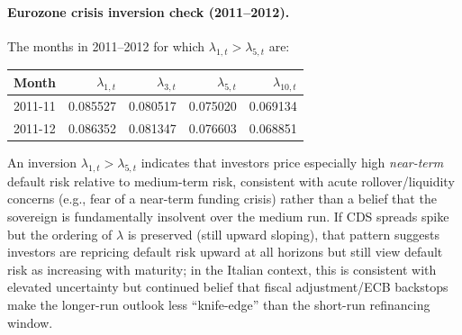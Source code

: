 \paragraph{Eurozone crisis inversion check (2011--2012).} The months in 2011--2012 for which $\lambda_{1,t}>\lambda_{5,t}$ are:
\begin{table}[H]\centering
\begin{tabular}{lrrrr}\toprule
Month & $\lambda_{1,t}$ & $\lambda_{3,t}$ & $\lambda_{5,t}$ & $\lambda_{10,t}$\\\midrule
2011-11 & 0.085527 & 0.080517 & 0.075020 & 0.069134\\
2011-12 & 0.086352 & 0.081347 & 0.076603 & 0.068851\\
\bottomrule\end{tabular}
\end{table}
An inversion $\lambda_{1,t}>\lambda_{5,t}$ indicates that investors price especially high \emph{near-term} default risk relative to medium-term risk, consistent with acute rollover/liquidity concerns (e.g., fear of a near-term funding crisis) rather than a belief that the sovereign is fundamentally insolvent over the medium run. If CDS spreads spike but the ordering of $\lambda$ is preserved (still upward sloping), that pattern suggests investors are repricing default risk upward at all horizons but still view default risk as increasing with maturity; in the Italian context, this is consistent with elevated uncertainty but continued belief that fiscal adjustment/ECB backstops make the longer-run outlook less ``knife-edge'' than the short-run refinancing window.